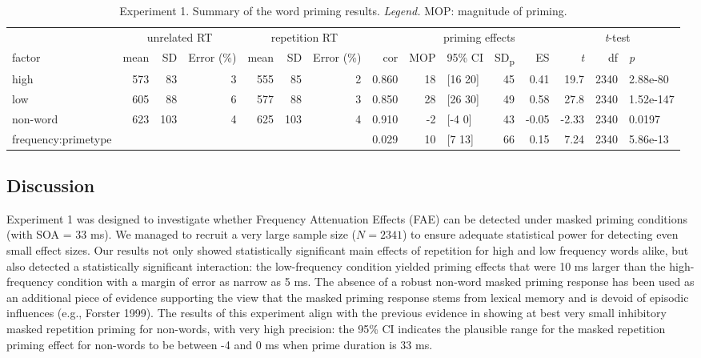 \documentclass[
]{interact}
\newcommand{\blandscape}{\begin{landscape}}
\newcommand{\elandscape}{\end{landscape}}
\begin{document}
\blandscape

\begin{longtable}{lrrrrrrrrlrrrrl}

\caption{\label{tbl-exp1-statsResults}Experiment 1. Summary of the word
priming results. \emph{Legend.} MOP: magnitude of priming.}

\tabularnewline

\toprule
 & \multicolumn{3}{c}{unrelated RT} & \multicolumn{3}{c}{repetition RT} &  & \multicolumn{4}{c}{priming effects} & \multicolumn{3}{c}{\emph{t}-test} \\ 
\cmidrule(lr){2-4} \cmidrule(lr){5-7} \cmidrule(lr){9-12} \cmidrule(lr){13-15}
factor & mean & SD & Error (\%) & mean & SD & Error (\%) & cor & MOP & 95\% CI & SD\textsubscript{p} & ES & \emph{t} & df & \emph{p} \\ 
\midrule\addlinespace[2.5pt]
high & 573 & 83 & 3 & 555 & 85 & 2 & 0.860 & 18 & [16 20] & 45 & 0.41 & 19.7 & 2340 & 2.88e-80 \\ 
low & 605 & 88 & 6 & 577 & 88 & 3 & 0.850 & 28 & [26 30] & 49 & 0.58 & 27.8 & 2340 & 1.52e-147 \\ 
non-word & 623 & 103 & 4 & 625 & 103 & 4 & 0.910 & -2 & [-4 0] & 43 & -0.05 & -2.33 & 2340 & 0.0197 \\ 
frequency:primetype &   &   &   &   &   &   & 0.029 & 10 & [7 13] & 66 & 0.15 & 7.24 & 2340 & 5.86e-13 \\ 
\bottomrule

\end{longtable}

\elandscape

\subsection{Discussion}\label{sec-exp1-discussion}

Experiment 1 was designed to investigate whether Frequency Attenuation
Effects (FAE) can be detected under masked priming conditions (with SOA
= 33 ms). We managed to recruit a very large sample size (\(N=2341\)) to
ensure adequate statistical power for detecting even small effect sizes.
Our results not only showed statistically significant main effects of
repetition for high and low frequency words alike, but also detected a
statistically significant interaction: the low-frequency condition
yielded priming effects that were 10 ms larger than the high-frequency
condition with a margin of error as narrow as 5 ms. The absence of a
robust non-word masked priming response has been used as an additional
piece of evidence supporting the view that the masked priming response
stems from lexical memory and is devoid of episodic influences (e.g.,
Forster 1999). The results of this experiment align with the previous
evidence in showing at best very small inhibitory masked repetition
priming for non-words, with very high precision: the 95\% CI indicates
the plausible range for the masked repetition priming effect for
non-words to be between -4 and 0 ms when prime duration is 33 ms.
\end{document}
